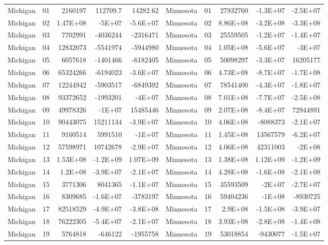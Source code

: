 \begin{landscape}
\begin{singlespace}
\begin{longtable}{lrrrr|lrrrr}
		Michigan &  01  & 2160197 & 112709.7 & 14282.62 & Minnesota &  01  & 27932760 & -1.3E+07 & -2.5E+07 \\
		Michigan &  02  & 1.47E+08 & -5E+07 & -5.6E+07 & Minnesota &  02  & 8.86E+08 & -3.2E+08 & -3.3E+08 \\
		Michigan &  03  & 7702991 & -4036244 & -2316471 & Minnesota &  03  & 25559505 & -1.2E+07 & -1.4E+07 \\
		Michigan &  04  & 12832073 & -5541974 & -5944980 & Minnesota &  04  & 1.05E+08 & -5.6E+07 & -3E+07 \\
		Michigan &  05  & 6057618 & -1401466 & -6182405 & Minnesota &  05  & 50098297 & -3.3E+07 & 16205177 \\
		Michigan &  06  & 65324266 & -6194023 & -3.6E+07 & Minnesota &  06  & 4.73E+08 & -8.7E+07 & -1.7E+08 \\
		Michigan &  07  & 12244942 & -5903517 & -6849392 & Minnesota &  07  & 78541400 & -4.3E+07 & -1.8E+07 \\
		Michigan &  08  & 93372652 & -1993201 & -4E+07 & Minnesota &  08  & 7.01E+08 & -7.7E+07 & -2.5E+08 \\
		Michigan &  09  & 49978326 & -1E+07 & 15485446 & Minnesota &  09  & 2.07E+08 & -8.4E+07 & 72944891 \\
		Michigan &  10 & 90443075 & 15211134 & -3.9E+07 & Minnesota &  10 & 4.06E+08 & -8088373 & -2.1E+07 \\
		Michigan &  11 & 9160514 & 5991510 & -1E+07 & Minnesota &  11 & 1.45E+08 & 13567579 & -6.2E+07 \\
		Michigan &  12 & 57598971 & 10742678 & -2.9E+07 & Minnesota &  12 & 4.06E+08 & 42311003 & -2E+08 \\
		Michigan &  13 & 1.53E+08 & -1.2E+09 & 1.07E+09 & Minnesota &  13 & 1.38E+08 & 1.12E+09 & -1.2E+09 \\
		Michigan &  14 & 1.2E+08 & -3.9E+07 & -2.1E+07 & Minnesota &  14 & 4.28E+08 & -1.6E+08 & -2.1E+08 \\
		Michigan &  15 & 3771306 & 8041365 & -1.1E+07 & Minnesota &  15 & 35593509 & -2E+07 & -2.7E+07 \\
		Michigan &  16 & 8309685 & -1.6E+07 & -3783197 & Minnesota &  16 & 59404236 & -1E+08 & -8930725 \\
		Michigan &  17 & 82518529 & -4.9E+07 & -3.8E+08 & Minnesota &  17 & 2.9E+08 & -1.5E+08 & -3.9E+07 \\
		Michigan &  18 & 76222305 & -5.4E+07 & -2.1E+07 & Minnesota &  18 & 3.93E+08 & -2.8E+08 & -1.4E+08 \\
		Michigan &  19 & 5764818 & -646122 & -1955758 & Minnesota &  19 & 53018854 & -9430077 & -1.5E+07 \\

\end{longtable}
\end{singlespace}
\end{landscape}
